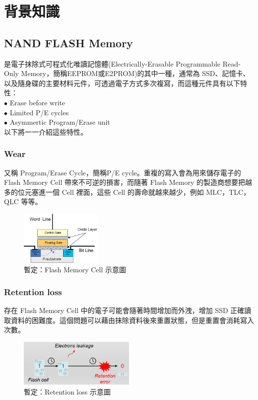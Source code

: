 \chapter{背景知識}

\section{NAND FLASH Memory}\label{s2.1}
\indent
是電子抹除式可程式化唯讀記憶體(Electrically-Erasable Programmable Read-Only Memory，簡稱EEPROM或E2PROM)的其中一種，通常為 SSD、記憶卡、以及隨身碟的主要材料元件，可透過電子方式多次複寫，而這種元件具有以下特性：\\
$\bullet$ Erase before write \\
$\bullet$ Limited P/E cycles \\
$\bullet$ Asymmertic Program/Erase unit \\
以下將一一介紹這些特性。

\subsection{Wear}\label{s2.1.1}
\indent
又稱 Program/Erase Cycle，簡稱P/E cycle。重複的寫入會為用來儲存電子的 Flash Memory Cell 帶來不可逆的損害，而隨著 Flash Memory 的製造商想要把越多的位元塞進一個 Cell 裡面，這些 Cell 的壽命就越來越少，例如 MLC，TLC，QLC 等等。
\begin{figure}[H]
    \centering
    \includegraphics[width=0.35\textwidth]{picture/ch2/wear.png}
    \caption{暫定：Flash Memory Cell 示意圖}
    \label{f2.1}
\end{figure}

\subsection{Retention loss}\label{s2.1.2}
\indent
存在 Flash Memory Cell 中的電子可能會隨著時間增加而外洩，增加 SSD 正確讀取資料的困難度。這個問題可以藉由抹除資料後來重置狀態，但是重置會消耗寫入次數。
\begin{figure}[H]
    \centering
    \includegraphics[width=0.5\textwidth]{picture/ch2/retention_loss.png}
    \caption{暫定：Retention loss 示意圖}
    \label{f2.2}
\end{figure}

